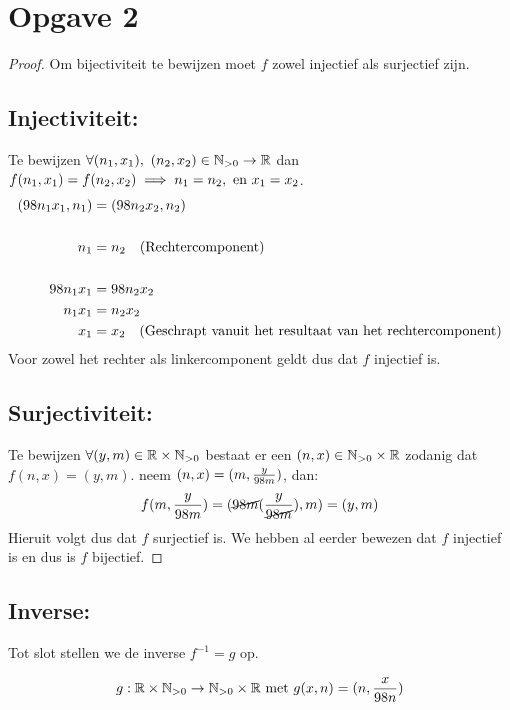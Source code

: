 \documentclass{article}
\begin{document}
\section*{Opgave 2}
\begin{proof}
    Om bijectiviteit te bewijzen moet $f$ zowel injectief als surjectief zijn.
    \subsection*{Injectiviteit:}
    Te bewijzen $\forall (n_1, x_1), \ (n_2, x_2) \in \mathbb{N}_{>0}
        \rightarrow \mathbb{R}$ dan $f(n_1, x_1) = f(n_2, x_2) \implies n_1 = n_2, \text{ en } x_1 = x_2$.
    \begin{align*}
        (98n_1x_1, n_1) & = (98n_2x_2, n_2)                                                          \\ \\
        n_1             & = n_2 \quad (\text{Rechtercomponent})                                        \\ \\
        98n_1x_1        & = 98n_2x_2                                                                 \\
        n_1x_1          & = n_2x_2                                                                   \\
        x_1             & = x_2 \quad (\text{Geschrapt vanuit het resultaat van het rechtercomponent})
    \end{align*}
    Voor zowel het rechter als linkercomponent geldt dus dat $f$ injectief is.
    \subsection*{Surjectiviteit:}
    Te bewijzen $\forall (y, m) \in \mathbb{R} \times \mathbb{N}_{>0}$
    bestaat er een $(n, x) \in \mathbb{N}_{>0} \times \mathbb{R}$
    zodanig dat $f(n, x) = (y, m)$.
    neem $(n, x) = (m, \frac{y}{98m})$, dan:
    \[f(m, \frac{y}{98m}) = (\cancel{98m}(\frac{y}{\cancel{98m}}), m) = (y, m)\]
    Hieruit volgt dus dat $f$ surjectief is. We hebben
    al eerder bewezen dat $f$ injectief is en dus is $f$
    bijectief.
\end{proof}
\subsection*{Inverse:}
Tot slot stellen we de inverse $f^{-1} = g$ op.

\[g: \mathbb{R} \times \mathbb{N}_{>0} \rightarrow \mathbb{N}_{>0} \times \mathbb{R} \text{ met } g(x, n) = (n, \frac{x}{98n}) \]
\end{document}
